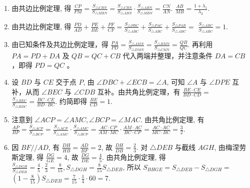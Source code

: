 \documentclass[10pt]{article}
\begin{document}
\begin{enumerate}
  \item 由共边比例定理, 得 $\frac{C P}{P M}=\frac{S_{\triangle C B N}}{S_{\triangle M B N}}=\frac{S_{\triangle C B N}}{S_{\triangle A B N}} \cdot \frac{S_{\triangle A B N}}{S_{\triangle M B N}}=\frac{C N}{A N}$. $\frac{A B}{M B}=\frac{1+\lambda_{1}}{\lambda_{2}}$.
  \item 由共边比例定理, 得 $\frac{P D}{A D}+\frac{P E}{B E}+\frac{P F}{C F}=\frac{S_{\triangle P B C}}{S_{\triangle A B C}}+\frac{S_{\triangle P A C}}{S_{\triangle A B C}}+\frac{S_{\triangle P A B}}{S_{\triangle A B C}}=$ $\frac{S_{\triangle A B C}}{S_{\triangle A B C}}=1$.
  \item 由已知条件及共边比例定理，得 $\frac{P A}{P D}=\frac{S_{\triangle A M N}}{S_{\triangle D M N}}=\frac{S_{\triangle B M N}}{S_{\triangle C M N}}=\frac{Q B}{Q C}$. 再利用 $P A=P D+D A$ 及 $Q B=Q C+C B$ 代入两端并整理，并注意条件 $D A=C B$ ，即得 $P D=Q C$ 。
  \item 设 $B D$ 与 $C E$ 交于点 $P$, 由 $\angle D B C+\angle E C B=\angle A$, 可知 $\angle A$ 与 $\angle D P E$ 互补，从而 $\angle B E C$ 与 $\angle C D B$ 互补。由共角比例定理，有 $\frac{B E \cdot C E}{B D \cdot C D}=$ $\frac{S_{\triangle B E C}}{S_{\triangle B D C}}=\frac{B C \cdot C E}{B D \cdot B C}$. 约简即得 $\frac{B E}{C D}=1$.
  \item 注意到 $\angle A C P=\angle A M C, \angle B C P=\angle M A C$. 由共角比例定理, 有 $\frac{A P}{B P}=\frac{S_{\triangle A C P}}{S_{\triangle B C P}}=\frac{S_{\triangle A C P}}{S_{\triangle A M C}} \cdot \frac{S_{\triangle A M C}}{S_{\triangle B C P}}=\frac{A C \cdot C P}{A M \cdot M C} \cdot \frac{A M \cdot A C}{B C \cdot C P}=\frac{A C \cdot A C}{M C \cdot B C}=\frac{3}{2}$.
  \item 因 $B F / / A D$, 有 $\frac{D H}{H B}=\frac{A D}{B F}=2$, 故 $\frac{D H}{D B}=\frac{2}{3}$. 对 $\triangle D E B$ 与截线 $A G H$, 由梅涅劳斯定理, 得 $\frac{D G}{G E}=4$, 故 $\frac{D G}{D E}=\frac{4}{5}$. 由共角比例定理, 得 $\frac{S_{\triangle D G H}}{S_{\triangle D E B}}=\frac{4}{5} \cdot \frac{2}{3}=\frac{8}{15}, S_{\triangle D G H}=\frac{8}{15} S_{\triangle D E B}$, 所以 $S_{B H G E}=S_{\triangle D E B}-S_{\triangle D G H}=$ $\left(1-\frac{8}{15}\right) S_{\triangle D E B}=\frac{7}{15} \cdot \frac{1}{4} \cdot 60=7$.
\end{enumerate}
\end{document}
